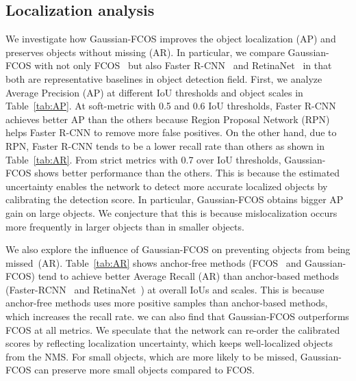 \documentclass[final]{cvpr}
\begin{document}
\subsection{Localization analysis}
We investigate how Gaussian-FCOS improves the object localization (AP) and preserves objects without missing (AR).
In particular, we compare Gaussian-FCOS with not only FCOS~\cite{Tian_2019_ICCV} but also Faster R-CNN~\cite{ren2015faster} and RetinaNet~\cite{lin2018focal} in that both are representative baselines in object detection field.
First, we analyze Average Precision (AP) at different IoU thresholds and object scales in Table~\ref{tab:AP}.
At soft-metric with 0.5 and 0.6 IoU thresholds, Faster R-CNN achieves better AP than the others because Region Proposal Network (RPN) helps Faster R-CNN to remove more false positives.
On the other hand, due to RPN, Faster R-CNN tends to be a lower recall rate than others as shown in Table~\ref{tab:AR}.
From strict metrics with 0.7 over IoU thresholds, Gaussian-FCOS shows better performance than the others.
This is because the estimated uncertainty enables the network to detect more accurate localized objects by calibrating the detection score.
In particular, Gaussian-FCOS obtains bigger AP gain on large objects.
We conjecture that this is because mislocalization occurs more frequently in larger objects than in smaller objects.

We also explore the influence of Gaussian-FCOS on preventing objects from being missed~(AR).  
Table~\ref{tab:AR} shows anchor-free methods (FCOS~\cite{Tian_2019_ICCV} and Gaussian-FCOS) tend to achieve better Average Recall (AR) than anchor-based methods (Faster-RCNN~\cite{ren2015faster} and RetinaNet~\cite{lin2018focal}) at overall IoUs and scales.
This is because anchor-free methods uses more positive samples than anchor-based methods, which increases the recall rate.
we can also find that Gaussian-FCOS outperforms FCOS at all metrics.
We speculate that the network can re-order the calibrated scores by reflecting localization uncertainty, which keeps well-localized objects from the NMS.
For small objects, which are more likely to be missed, Gaussian-FCOS can preserve more small objects compared to FCOS.
\end{document}
